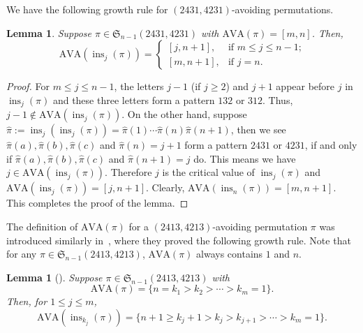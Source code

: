 \documentclass[12pt]{amsart}
\numberwithin{equation}{section}
\theoremstyle{plain}
\newtheorem{lemma}[theorem]{Lemma}
\theoremstyle{definition}
\def\S{\mathfrak{S}}
\def\ins{\operatorname{ins}}
\def\AVA{\mathrm{AVA}}
\begin{document}
We have the following growth rule for $(2431,4231)$-avoiding permutations. 
\begin{lemma}\label{insert:2431}Suppose $\pi\in\S_{n-1}(2431,4231)$ with 
$\AVA(\pi)=[m,n]$.
Then, 
$$
\AVA(\ins_j(\pi))=
\begin{cases}
[j,n+1], & \text{if $m\leq j\leq n-1$;}\\
[m,n+1], & \text{if $j=n$.} 
\end{cases}
$$
\end{lemma}
\begin{proof}
For  $m\leq j\leq n-1$, the letters $j-1$ (if $j\ge 2$) and $j+1$ appear before $j$ in $\ins_j(\pi)$ and these three letters form a pattern $132$ or $312$. Thus, $j-1\notin\AVA(\ins_j(\pi))$. On the other hand, suppose $\hat\pi:=\ins_j(\ins_j(\pi))=\hat\pi(1)\cdots\hat\pi(n)\hat\pi(n+1)$, then we see $\hat\pi(a),\hat\pi(b),\hat\pi(c)$ and $\hat\pi(n)=j+1$ form a pattern $2431$ or $4231$, if and only if $\hat\pi(a),\hat\pi(b),\hat\pi(c)$ and $\hat\pi(n+1)=j$ do. This means we have $j\in\AVA(\ins_j(\pi))$. Therefore $j$ is the critical value of $\ins_j(\pi)$ and $\AVA(\ins_j(\pi))=[j,n+1]$. Clearly, $\AVA(\ins_n(\pi))=[m,n+1]$. This completes the proof of the lemma. 
\end{proof}



The definition of $\AVA(\pi)$ for a $(2413,4213)$-avoiding permutation $\pi$ was introduced similarly in~\cite{LK}, where they proved the following growth rule. Note that for any $\pi\in\S_{n-1}(2413,4213)$, $\AVA(\pi)$ always contains $1$ and $n$.
\begin{lemma}[]
\label{insert:2413}Suppose $\pi\in\S_{n-1}(2413,4213)$ with 
$$
\AVA(\pi)=\{n=k_1>k_2>\cdots>k_m=1\}.
$$
Then, for  $1\leq j\leq m$,
$$
\AVA(\ins_{k_j}(\pi))=\{n+1\geq k_j+1>k_j>k_{j+1}>\cdots>k_m=1\}.
$$
\end{lemma}
 
\end{document}
